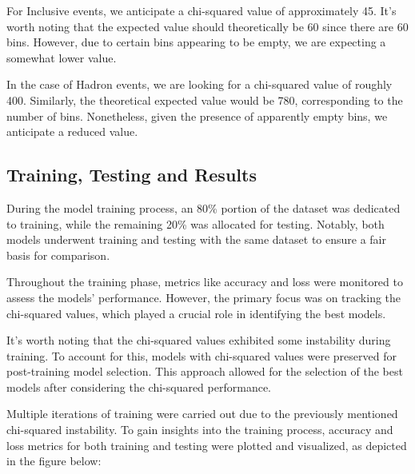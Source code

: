 \documentclass{article}
\begin{document}
For Inclusive events, we anticipate a chi-squared value of approximately 45. It's worth noting that the expected value should theoretically be 60 since there are 60 bins. However, due to certain bins appearing to be empty, we are expecting a somewhat lower value.

In the case of Hadron events, we are looking for a chi-squared value of roughly 400. Similarly, the theoretical expected value would be 780, corresponding to the number of bins. Nonetheless, given the presence of apparently empty bins, we anticipate a reduced value.

\subsection{Training, Testing and Results}

During the model training process, an 80\% portion of the dataset was dedicated to training, while the remaining 20\% was allocated for testing. Notably, both models underwent training and testing with the same dataset to ensure a fair basis for comparison.

Throughout the training phase, metrics like accuracy and loss were monitored to assess the models' performance. However, the primary focus was on tracking the chi-squared values, which played a crucial role in identifying the best models.

It's worth noting that the chi-squared values exhibited some instability during training. To account for this, models with chi-squared values were preserved for post-training model selection. This approach allowed for the selection of the best models after considering the chi-squared performance.

Multiple iterations of training were carried out due to the previously mentioned chi-squared instability. To gain insights into the training process, accuracy and loss metrics for both training and testing were plotted and visualized, as depicted in the figure below:
\end{document}
